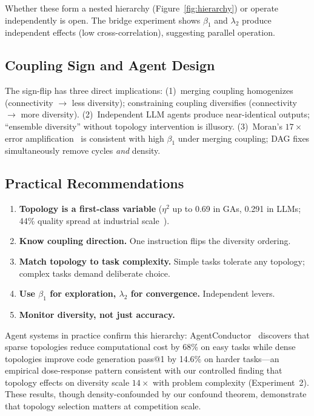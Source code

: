 \documentclass[runningheads]{llncs}
\begin{document}
\noindent
Whether these form a nested hierarchy (Figure~\ref{fig:hierarchy})
or operate independently is open. The bridge experiment shows
$\beta_1$ and $\lambda_2$ produce independent effects (low
cross-correlation), suggesting parallel operation.

\subsection{Coupling Sign and Agent Design}

The sign-flip has three direct implications: (1)~merging coupling
homogenizes (connectivity $\to$ less diversity); constraining coupling
diversifies (connectivity $\to$ more diversity).
(2)~Independent LLM agents produce near-identical outputs; ``ensemble
diversity'' without topology intervention is illusory.
(3)~Moran's $17{\times}$ error amplification~\cite{moran2025error} is
consistent with high $\beta_1$ under merging coupling; DAG fixes
simultaneously remove cycles \emph{and} density.

\subsection{Practical Recommendations}

\begin{enumerate}[nosep]
  \item \textbf{Topology is a first-class variable} ($\eta^2$ up to
    0.69 in GAs, 0.291 in LLMs; 44\% quality spread at industrial
    scale~\cite{dochkina2026}).
  \item \textbf{Know coupling direction.} One instruction flips the
    diversity ordering.
  \item \textbf{Match topology to task complexity.} Simple tasks
    tolerate any topology; complex tasks demand deliberate choice.
  \item \textbf{Use $\beta_1$ for exploration, $\lambda_2$ for
    convergence.} Independent levers.
  \item \textbf{Monitor diversity, not just accuracy.}
\end{enumerate}

\noindent
Agent systems in practice confirm this hierarchy:
AgentConductor~\cite{agentconductor2026} discovers that sparse
topologies reduce computational cost by 68\% on easy tasks while dense
topologies improve code generation pass@1 by 14.6\% on harder
tasks---an empirical dose-response pattern consistent with our
controlled finding that topology effects on diversity scale $14\times$
with problem complexity (Experiment~2).  These results, though
density-confounded by our confound theorem, demonstrate that topology
selection matters at competition scale.
\end{document}
